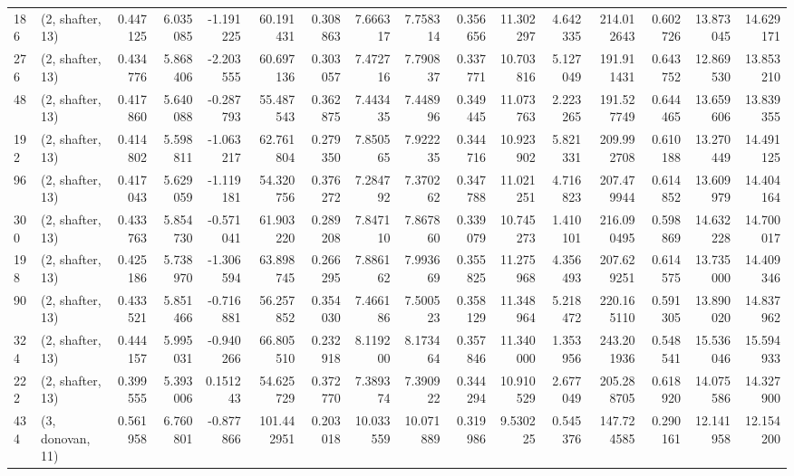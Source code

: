 \begin{tabular}{llrrrrrrrrrrrrrr}
186 &  (2, shafter, 13) &   0.447125 &   6.035085 &  -1.191225 &    60.191431 &   0.308863 &   7.666317 &   7.758314 &  0.356656 &  11.302297 &   4.642335 &   214.012643 &  0.602726 &  13.873045 &  14.629171 \\
276 &  (2, shafter, 13) &   0.434776 &   5.868406 &  -2.203555 &    60.697136 &   0.303057 &   7.472716 &   7.790837 &  0.337771 &  10.703816 &   5.127049 &   191.911431 &  0.643752 &  12.869530 &  13.853210 \\
48  &  (2, shafter, 13) &   0.417860 &   5.640088 &  -0.287793 &    55.487543 &   0.362875 &   7.443435 &   7.448996 &  0.349445 &  11.073763 &   2.223265 &   191.527749 &  0.644465 &  13.659606 &  13.839355 \\
192 &  (2, shafter, 13) &   0.414802 &   5.598811 &  -1.063217 &    62.761804 &   0.279350 &   7.850565 &   7.922235 &  0.344716 &  10.923902 &   5.821331 &   209.992708 &  0.610188 &  13.270449 &  14.491125 \\
96  &  (2, shafter, 13) &   0.417043 &   5.629059 &  -1.119181 &    54.320756 &   0.376272 &   7.284792 &   7.370262 &  0.347788 &  11.021251 &   4.716823 &   207.479944 &  0.614852 &  13.609979 &  14.404164 \\
300 &  (2, shafter, 13) &   0.433763 &   5.854730 &  -0.571041 &    61.903220 &   0.289208 &   7.847110 &   7.867860 &  0.339079 &  10.745273 &   1.410101 &   216.090495 &  0.598869 &  14.632228 &  14.700017 \\
198 &  (2, shafter, 13) &   0.425186 &   5.738970 &  -1.306594 &    63.898745 &   0.266295 &   7.886162 &   7.993669 &  0.355825 &  11.275968 &   4.356493 &   207.629251 &  0.614575 &  13.735000 &  14.409346 \\
90  &  (2, shafter, 13) &   0.433521 &   5.851466 &  -0.716881 &    56.257852 &   0.354030 &   7.466186 &   7.500523 &  0.358129 &  11.348964 &   5.218472 &   220.165110 &  0.591305 &  13.890020 &  14.837962 \\
324 &  (2, shafter, 13) &   0.444157 &   5.995031 &  -0.940266 &    66.805510 &   0.232918 &   8.119200 &   8.173464 &  0.357846 &  11.340000 &   1.353956 &   243.201936 &  0.548541 &  15.536046 &  15.594933 \\
222 &  (2, shafter, 13) &   0.399555 &   5.393006 &   0.151243 &    54.625729 &   0.372770 &   7.389374 &   7.390922 &  0.344294 &  10.910529 &   2.677049 &   205.288705 &  0.618920 &  14.075586 &  14.327900 \\
434 &  (3, donovan, 11) &   0.561958 &   6.760801 &  -0.877866 &   101.442951 &   0.203018 &  10.033559 &  10.071889 &  0.319986 &   9.530225 &   0.545376 &   147.724585 &  0.290161 &  12.141958 &  12.154200 \\

\end{tabular}
